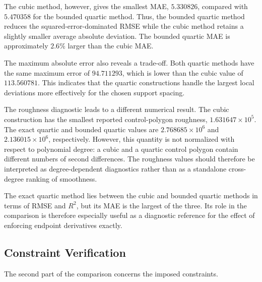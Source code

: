 \documentclass[12pt,a4paper]{article}
\begin{document}
The cubic method, however, gives the smallest MAE, \(5.330826\), compared with
\(5.470358\) for the bounded quartic method. Thus, the bounded quartic method
reduces the squared-error-dominated RMSE while the cubic method retains a
slightly smaller average absolute deviation. The bounded quartic MAE is
approximately \(2.6\%\) larger than the cubic MAE.

The maximum absolute error also reveals a trade-off. Both quartic methods have
the same maximum error of \(94.711293\), which is lower than the cubic value
of \(113.560781\). This indicates that the quartic constructions handle the
largest local deviations more effectively for the chosen support spacing.

The roughness diagnostic leads to a different numerical result. The cubic
construction has the smallest reported control-polygon roughness,
\(1.631647\times 10^{5}\). The exact quartic and bounded quartic values are
\(2.768685\times 10^{6}\) and \(2.136015\times 10^{6}\), respectively.
However, this quantity is not normalized with respect to polynomial degree:
a cubic and a quartic control polygon contain different numbers of second
differences. The roughness values should therefore be interpreted as
degree-dependent diagnostics rather than as a standalone cross-degree ranking
of smoothness.

The exact quartic method lies between the cubic and bounded quartic methods in
terms of RMSE and \(R^2\), but its MAE is the largest of the three. Its role in
the comparison is therefore especially useful as a diagnostic reference for
the effect of enforcing endpoint derivatives exactly.

\subsection{Constraint Verification}

The second part of the comparison concerns the imposed constraints.

\begin{table}[H]
\centering
\small
{}
\caption{Verification of endpoint interpolation, mean preservation, and lower-bound admissibility. The control lower violation is computed from the B\'ezier control points, while the dense lower violation is computed from the evaluated curve on the dense grid.}
\label{tab:constraint-verification}
\end{table}
\end{document}
